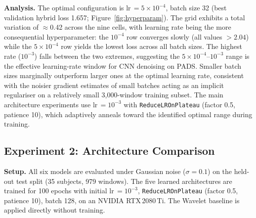 \documentclass{article}
\begin{document}
\textbf{Analysis.}
The optimal configuration is lr\,$=5\times10^{-4}$, batch size 32 (best
validation hybrid loss 1.657; Figure~\ref{fig:hyperparam}).
The grid exhibits a total variation of $\approx$0.42 across the nine cells,
with learning rate being the more consequential hyperparameter: the
$10^{-4}$ row converges slowly (all values $> 2.04$) while the
$5\times10^{-4}$ row yields the lowest loss across all batch sizes.
The highest rate ($10^{-3}$) falls between the two extremes, suggesting the
$5\times10^{-4}$--$10^{-3}$ range is the effective learning-rate window for
CNN denoising on PADS.
Smaller batch sizes marginally outperform larger ones at the optimal learning
rate, consistent with the noisier gradient estimates of small batches acting
as an implicit regulariser on a relatively small 3{,}000-window training
subset.
The main architecture experiments use lr\,$=10^{-3}$ with
\texttt{ReduceLROnPlateau} (factor 0.5, patience 10), which adaptively
anneals toward the identified optimal range during training.

\subsection{Experiment 2: Architecture Comparison}
\label{sec:exp-arch}

\textbf{Setup.}
All six models are evaluated under Gaussian noise ($\sigma=0.1$) on the
held-out test split (35 subjects, 979 windows).
The five learned architectures are trained for 100 epochs with initial
lr\,$=10^{-3}$, \texttt{ReduceLROnPlateau} (factor 0.5, patience 10),
batch 128, on an NVIDIA RTX\,2080\,Ti.
The Wavelet baseline is applied directly without training.
\end{document}
